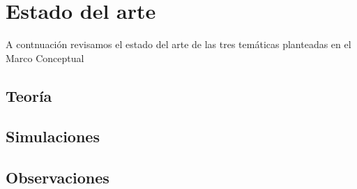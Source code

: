
\section{Estado del arte}

A contnuaci\'on revisamos el estado del arte de las tres tem\'aticas
planteadas en el Marco Conceptual


\subsection{Teor\'ia}

\subsection{Simulaciones}


\subsection{Observaciones}


